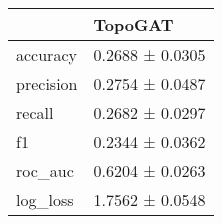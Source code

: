\begin{tabular}{ll}
\toprule
 & TopoGAT \\
\midrule
accuracy & 0.2688 ± 0.0305 \\
precision & 0.2754 ± 0.0487 \\
recall & 0.2682 ± 0.0297 \\
f1 & 0.2344 ± 0.0362 \\
roc_auc & 0.6204 ± 0.0263 \\
log_loss & 1.7562 ± 0.0548 \\
\bottomrule
\end{tabular}
